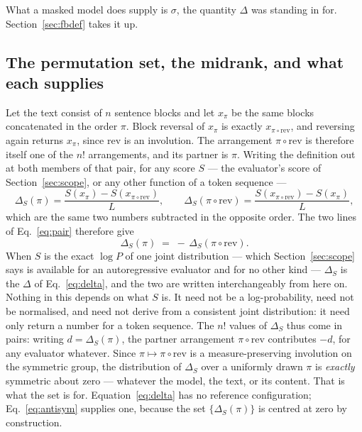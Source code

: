 \documentclass[11pt]{article}
\begin{document}
What a masked model does supply is $\sigma$, the quantity $\Delta$ was
standing in for.
Section~\ref{sec:fbdef} takes it up.

\subsection{The permutation set, the midrank, and what each supplies}
\label{sec:blkord}
Let the text consist of $n$ sentence blocks and let $x_\pi$ be the same blocks
concatenated in the order $\pi$.  Block reversal of $x_\pi$ is exactly
$x_{\pi\circ\mathrm{rev}}$, and reversing again returns $x_\pi$, since
$\mathrm{rev}$ is an involution.  The arrangement $\pi\circ\mathrm{rev}$ is
therefore itself one of the $n!$ arrangements, and its partner is $\pi$.
Writing the definition out at both members of that pair, for any score $S$ ---
the evaluator's score of Section~\ref{sec:scope}, or any other function of a
token sequence ---
\begin{equation}
\Delta_S(\pi) = \frac{S(x_\pi) - S(x_{\pi\circ\mathrm{rev}})}{L},
\qquad
\Delta_S(\pi\circ\mathrm{rev})
  = \frac{S(x_{\pi\circ\mathrm{rev}}) - S(x_\pi)}{L} ,
\label{eq:pair}
\end{equation}
which are the same two numbers subtracted in the opposite order.  The two
lines of Eq.~\eqref{eq:pair} therefore give
\begin{equation}
\Delta_S(\pi) \;=\; -\,\Delta_S(\pi\circ\mathrm{rev}).
\label{eq:antisym}
\end{equation}
When $S$ is the exact $\log P$ of one joint distribution --- which
Section~\ref{sec:scope} says is available for an autoregressive evaluator
and for no other kind --- $\Delta_S$ is the $\Delta$ of
Eq.~\eqref{eq:delta}, and the two are written interchangeably from here on.
Nothing in this depends on what $S$ is.  It need not be a log-probability, need
not be normalised, and need not derive from a consistent joint distribution: it
need only return a number for a token sequence.  The $n!$ values of $\Delta_S$
thus come in pairs: writing $d = \Delta_S(\pi)$, the partner arrangement
$\pi\circ\mathrm{rev}$ contributes $-d$, for any evaluator whatever.
Since $\pi \mapsto \pi\circ\mathrm{rev}$ is a measure-preserving involution on
the symmetric group, the distribution of $\Delta_S$ over a uniformly drawn $\pi$
is \emph{exactly} symmetric about zero --- whatever the model, the text, or its
content.  That is what the set is for.  Equation~\eqref{eq:delta} has no
reference configuration; Eq.~\eqref{eq:antisym} supplies one, because the
set $\{\Delta_S(\pi)\}$ is centred at zero by construction.
\end{document}
